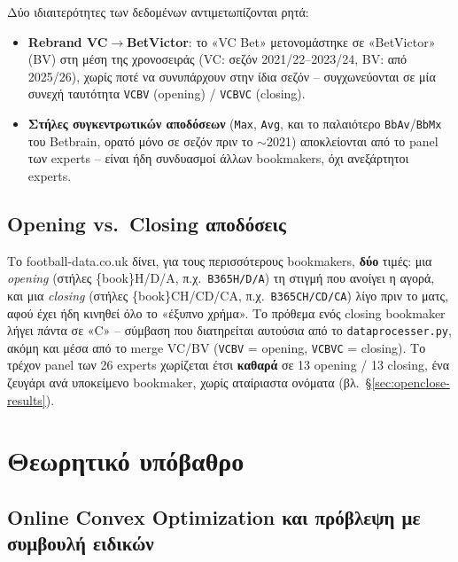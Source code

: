 \documentclass[11pt,a4paper]{article}
\newcommand{\file}[1]{\texttt{#1}}
\newcommand{\var}[1]{\texttt{#1}}
\renewcommand{\_}{\oldunderscore\allowbreak}
\begin{document}
Δύο ιδιαιτερότητες των δεδομένων αντιμετωπίζονται ρητά:
\begin{itemize}
  \item \textbf{Rebrand VC$\to$BetVictor}: το «VC Bet» μετονομάστηκε σε «BetVictor» (BV) στη
        μέση της χρονοσειράς (VC: σεζόν 2021/22--2023/24, BV: από 2025/26), χωρίς ποτέ να
        συνυπάρχουν στην ίδια σεζόν -- συγχωνεύονται σε μία συνεχή ταυτότητα
        \var{VC\_BV} (opening) / \var{VC\_BVC} (closing).
  \item \textbf{Στήλες συγκεντρωτικών αποδόσεων} (\var{Max}, \var{Avg}, και το παλαιότερο
        \var{BbAv}/\var{BbMx} του Betbrain, ορατό μόνο σε σεζόν πριν το $\sim$2021)
        αποκλείονται από το panel των experts -- είναι ήδη συνδυασμοί άλλων bookmakers,
        όχι ανεξάρτητοι experts.
\end{itemize}

\subsection{Opening vs.\ Closing αποδόσεις}
\label{sec:openclose}

Το football-data.co.uk δίνει, για τους περισσότερους bookmakers, \textbf{δύο} τιμές: μια
\emph{opening} (στήλες \{book\}H/D/A, π.χ.\ \var{B365H/D/A}) τη στιγμή που ανοίγει η
αγορά, και μια \emph{closing} (στήλες \{book\}CH/CD/CA, π.χ.\ \var{B365CH/CD/CA}) λίγο πριν
το ματς, αφού έχει ήδη κινηθεί όλο το «έξυπνο χρήμα». Το πρόθεμα ενός closing bookmaker
λήγει πάντα σε «C» -- σύμβαση που διατηρείται αυτούσια από το \file{data\_processer.py}, ακόμη
και μέσα από το merge VC/BV (\var{VC\_BV} = opening, \var{VC\_BVC} = closing). Το τρέχον
panel των 26 experts χωρίζεται έτσι \textbf{καθαρά} σε 13 opening / 13 closing, ένα ζευγάρι
ανά υποκείμενο bookmaker, χωρίς αταίριαστα ονόματα (βλ.~\S\ref{sec:openclose-results}).

\section{Θεωρητικό υπόβαθρο}

\subsection{Online Convex Optimization και πρόβλεψη με συμβουλή ειδικών}
\end{document}
